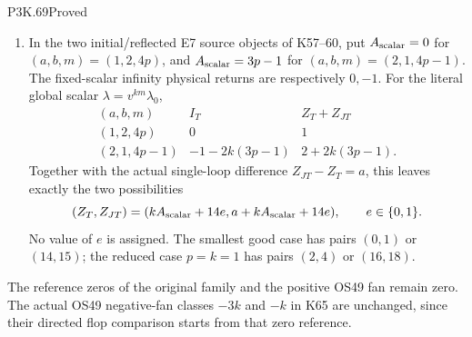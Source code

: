 \begin{statement}{P3K.69}{Proved}
\begin{enumerate}
\item In the two initial/reflected E7 source objects of K57--60, put
\(A_{\rm scalar}=0\) for \((a,b,m)=(1,2,4p)\), and
\(A_{\rm scalar}=3p-1\) for \((a,b,m)=(2,1,4p-1)\).
The fixed-scalar infinity physical returns are respectively \(0,-1\).
For the literal global scalar \(\lambda=v^{km}\lambda_0\),
\[
\begin{array}{c|cc}
 (a,b,m)&I_T&Z_T+Z_{JT}\\\hline
 (1,2,4p)&0&1\\
 (2,1,4p-1)&-1-2k(3p-1)&2+2k(3p-1).
\end{array}
\]
Together with the actual single-loop difference \(Z_{JT}-Z_T=a\),
this leaves exactly the two possibilities
\[
 (Z_T,Z_{JT})=(kA_{\rm scalar}+14e,
                 a+kA_{\rm scalar}+14e),\qquad e\in\{0,1\}.
\]
No value of \(e\) is assigned. The smallest good case has pairs
\((0,1)\) or \((14,15)\); the reduced case \(p=k=1\) has pairs
\((2,4)\) or \((16,18)\).
\end{enumerate}
The reference zeros of the original family and the positive OS49
fan remain zero. The actual OS49 negative-fan classes \(-3k\) and
\(-k\) in K65 are unchanged, since their directed flop comparison
starts from that zero reference.
\end{statement}
